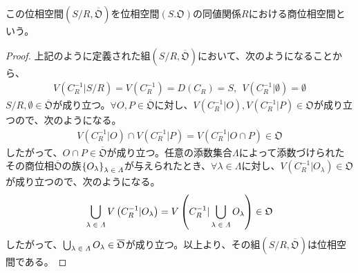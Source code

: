 \documentclass[dvipdfmx]{jsarticle}
\begin{document}
\begin{dfn}
この位相空間$\left( {S}/{R},\overline{\mathfrak{O}} \right)$を位相空間$\left( S.\mathfrak{O} \right)$の同値関係$R$における商位相空間という。
\end{dfn}
\begin{proof}
上記のように定義された組$\left( {S}/{R},\overline{\mathfrak{O}} \right)$において、次のようになることから、
\begin{align*}
V\left( C_{R}^{- 1}|{S}/{R} \right) = V\left( C_{R}^{- 1} \right) = D\left( C_{R} \right) = S,\ \ V\left( C_{R}^{- 1}|\emptyset \right) = \emptyset
\end{align*}
${S}/{R},\emptyset \in \overline{\mathfrak{O}}$が成り立つ。$\forall O,P \in \overline{\mathfrak{O}}$に対し、$V\left( C_{R}^{- 1}|O \right),V\left( C_{R}^{- 1}|P \right)\in \mathfrak{O}$が成り立つので、次のようになる。
\begin{align*}
V\left( C_{R}^{- 1}|O \right) \cap V\left( C_{R}^{- 1}|P \right) = V\left( C_{R}^{- 1}|O \cap P \right)\in \mathfrak{O}
\end{align*}
したがって、$O \cap P \in \overline{\mathfrak{O}}$が成り立つ。任意の添数集合$\varLambda$によって添数づけられたその商位相$\overline{\mathfrak{O}}$の族$\left\{ O_{\lambda} \right\}_{\scriptsize \begin{matrix}
\lambda \in \varLambda \\
\end{matrix}}$が与えられたとき、$\forall\lambda \in \varLambda$に対し、$V\left( C_{R}^{- 1}|O_{\lambda} \right)\in \mathfrak{O}$が成り立つので、次のようになる。
\begin{align*}
\bigcup_{\scriptsize \begin{matrix}
\lambda \in \varLambda \\
\end{matrix}} {V\left( C_{R}^{- 1}|O_{\lambda} \right)} = V\left( C_{R}^{- 1}|\bigcup_{\scriptsize \begin{matrix}
\lambda \in \varLambda \\
\end{matrix}} O_{\lambda} \right)\in \mathfrak{O}
\end{align*}
したがって、$\bigcup_{\scriptsize \begin{matrix}
\lambda \in \varLambda \\
\end{matrix}} O_{\lambda} \in \overline{\mathfrak{O}}$が成り立つ。以上より、その組$\left( {S}/{R},\overline{\mathfrak{O}} \right)$は位相空間である。
\end{proof}
\end{document}
